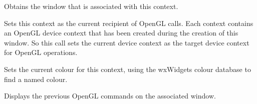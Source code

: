 
Obtains the window that is associated with this context.

\label{wxglcontextsetcurrent}


Sets this context as the current recipient of OpenGL calls.
Each context contains an OpenGL device context that has been created during
the creation of this window. So this call sets the current device context
as the target device context for OpenGL operations.

\label{wxglcontextsetcolour}


Sets the current colour for this context, using the wxWidgets colour database to find a named colour.

\label{wxglcontextswapbuffers}


Displays the previous OpenGL commands on the associated window.
